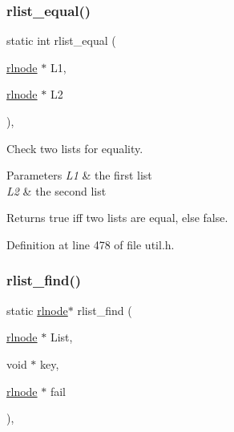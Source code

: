 \subsubsection{\texorpdfstring{rlist\+\_\+equal()}{rlist\_equal()}}
{\footnotesize\ttfamily static int rlist\+\_\+equal (\begin{DoxyParamCaption}\item[{\hyperlink{group__rlists_ga8f6244877f7ce2322c90525217ea6e7a}{rlnode} $\ast$}]{L1,  }\item[{\hyperlink{group__rlists_ga8f6244877f7ce2322c90525217ea6e7a}{rlnode} $\ast$}]{L2 }\end{DoxyParamCaption})\hspace{0.3cm}{\ttfamily [inline]}, {\ttfamily [static]}}



Check two lists for equality. 


\begin{DoxyParams}{Parameters}
{\em L1} & the first list \\
\hline
{\em L2} & the second list \\
\hline
\end{DoxyParams}
\begin{DoxyReturn}{Returns}
true iff two lists are equal, else false. 
\end{DoxyReturn}


Definition at line 478 of file util.\+h.

\mbox{\label{group__rlists_gafbb3a5edeac9f1d43130528292c47cf6}} 
\subsubsection{\texorpdfstring{rlist\+\_\+find()}{rlist\_find()}}
{\footnotesize\ttfamily static \hyperlink{group__rlists_ga8f6244877f7ce2322c90525217ea6e7a}{rlnode}$\ast$ rlist\+\_\+find (\begin{DoxyParamCaption}\item[{\hyperlink{group__rlists_ga8f6244877f7ce2322c90525217ea6e7a}{rlnode} $\ast$}]{List,  }\item[{void $\ast$}]{key,  }\item[{\hyperlink{group__rlists_ga8f6244877f7ce2322c90525217ea6e7a}{rlnode} $\ast$}]{fail }\end{DoxyParamCaption})\hspace{0.3cm}{\ttfamily [inline]}, {\ttfamily [static]}}



